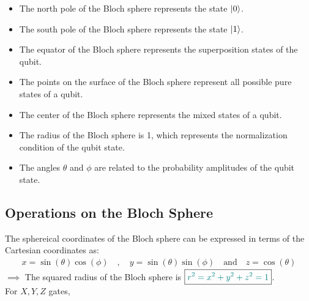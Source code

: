 \documentclass{book}
\begin{document}
\begin{itemize}
    \item The north pole of the Bloch sphere represents the state $\ket{0}$.
    \item The south pole of the Bloch sphere represents the state $\ket{1}$.
    \item The equator of the Bloch sphere represents the superposition states of the qubit.
    \item The points on the surface of the Bloch sphere represent all possible pure states of a qubit.
    \item The center of the Bloch sphere represents the mixed states of a qubit.
    \item The radius of the Bloch sphere is 1, which represents the normalization condition of the qubit state.
    \item The angles $\theta$ and $\phi$ are related to the probability amplitudes of the qubit state.
\end{itemize}

\newpage
\subsection{Operations on the Bloch Sphere}
The sphereical coordinates of the Bloch sphere can be expressed in terms of the Cartesian coordinates as:
\begin{align*}
    \boxed{x = \sin(\theta)\cos(\phi)} \quad, \quad \boxed{y = \sin(\theta)\sin(\phi)} \quad \text{and} \quad \boxed{z = \cos(\theta)}
\end{align*}
$\implies$ The squared radius of the Bloch sphere is $\boxed{\textcolor{teal}{r^2 = x^2 + y^2 + z^2 = 1}}$.\\
\vspace{2mm}
For $X, Y, Z$ gates, 
\end{document}
